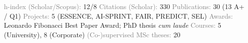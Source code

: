 \vspace{5mm}
\begin{cventries}
  \cventry
    {\empty} %
    {\textcolor{graytext}{h-index (Scholar/Scopus):} 12/8} %
    {} %
    {} %
    {}
    \vspace{-7mm}
  \cventry
    {\empty} %
    {\textcolor{graytext}{Citations (Scholar):} 330} %
    {} %
    {} %
    {}
    \vspace{-7mm}
  \cventry
    {\empty} %
    {\textcolor{graytext}{Publications:} 30 (13 A+ / Q1)} %
    {} %
    {} %
    {}
    \vspace{-7mm}
  \cventry
    {\empty} %
    {\textcolor{graytext}{Projects:} 5 (ESSENCE, AI-SPRINT, FAIR, PREDICT, SEL)} %
    {} %
    {} %
    {}
    \vspace{-7mm}
  \cventry
    {\empty} %
    {\textcolor{graytext}{Awards:} Leonardo Fibonacci Best Paper Award; PhD thesis \emph{cum laude}} %
    {} %
    {} %
    {}
    \vspace{-7mm}
  \cventry
    {\empty} %
    {\textcolor{graytext}{Courses:} 5 (University), 8 (Corporate)} %
    {} %
    {} %
    {}
    \vspace{-7mm}
  \cventry
    {\empty} %
    {\textcolor{graytext}{(Co-)supervised MSc theses:} 20} %
    {} %
    {} %
    {}
\end{cventries}

